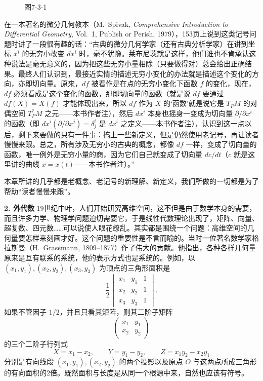 \begin{figure}[htbp]
\centering
{}
\caption*{图7-3-1}
\end{figure}

在一本著名的微分几何教本（M.~Spivak, \textit{Comprehensive Introduction to Differential Geometry}, Vol.~1, Publish or Perish, 1979），153页上说到这类记号问题时讲了一段很有趣的话：“古典的微分几何学家（还有古典分析学家）在讲到坐标 $x^i$ 的无穷小改变 $dx^i$ 时，毫不犹豫。莱布尼茨就是这样，他们谁也不肯承认这种说法是毫无意义的，因为把这些无穷小量相除（只要做得对）总会给出正确结果。最终人们认识到，最接近实情的描述无穷小变化的办法就是描述这个变化的方向，亦即切向量。原来，$df$ 被看作是在点的无穷小变化下函数 $f$ 的变化，现在，$df$ 必须看成是这个变化的函数，那即切向量的函数（就是说 $df$ 要通过 $df(X)=X(f)$ 才能体现出来，所以 $df$ 作为 $X$ 的‘函数’就是说它是 $T_PM$ 的对偶空间 $T_P^*M$ 之元——本书作者注），然后 $dx^i$ 本身也摇身一变成为切向量 $\partial/\partial x^i$ 的函数（即 $dx^i(\partial/\partial x^j)=\delta^i_j$ 是 $dx^i$ 之定义——本书作者注），认识到这一点以后，剩下来要做的只有一件事：搞上一些新定义，但是仍然使用老记号，再让读者慢慢来跟。总之，所有涉及无穷小的古典的概念，都像 $df$ 一样，变成了切向量的函数，唯一例外是无穷小量的商，因为它们自己就变成了切向量 $dc/dt$（$c$ 就是这里讲的曲线 $x=x(t)$——本书作者注）。”

本章所讲的几乎都是老概念、老记号的新理解、新定义，我们所做的一切都是为了帮助“读者慢慢来跟”。

\noindent\textbf{2. 外代数}\quad
19世纪中叶，人们开始研究高维空间，这不但是由于数学本身的需要，而且许多力学、物理学问题迫切需要它，于是线性代数理论出现了，矩阵、向量、超复数、四元数……可以说使人眼花缭乱。其实都是围绕一个问题：高维空间的几何量要怎样来刻画才好。这个问题的重要性是不言而喻的。当时一位著名数学家格拉斯曼（H.~Grassmann, 1809--1877）作了伟大的贡献。他指出，各种各样几何量原来是互有联系的系统，他的表示方式也是系统的。例如，以 $(x_1,y_1),(x_2,y_2),(x_3,y_3)$ 为顶点的三角形面积是
\[
 \frac12\begin{vmatrix}
 x_1&y_1&1\\x_2&y_2&1\\x_3&y_3&1
 \end{vmatrix}.
\]
如果不管因子 $1/2$，并且只看其矩阵，则其二阶子矩阵
\[
 \begin{pmatrix}x_1&y_1\\x_2&y_2\end{pmatrix}
\]
的三个二阶子行列式
\[
 X=x_1-x_2,\qquad Y=y_1-y_2,\qquad Z=x_1y_2-x_2y_1
\]
分别是有向线段 $(x_1,y_1),(x_2,y_2)$ 的两个投影以及原点 $O$ 与这两点所成三角形的有向面积的2倍。既然面积与长度是从同一个根源中来，自然也应该有符号。

